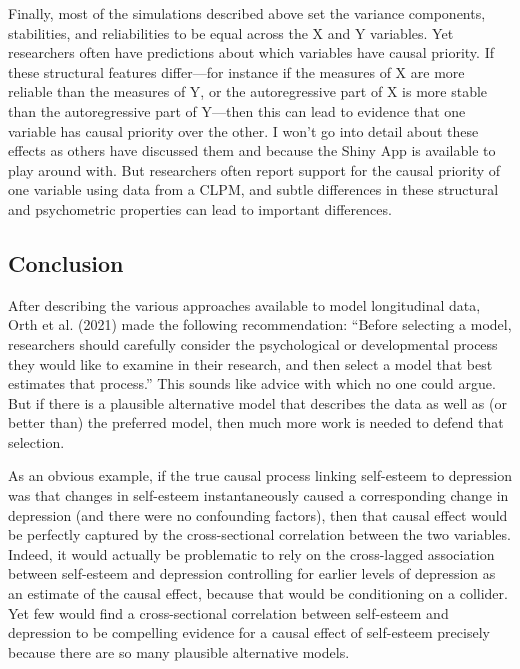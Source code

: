 \documentclass[
  english,
  man,floatsintext]{apa6}
\begin{document}
Finally, most of the simulations described above set the variance components, stabilities, and reliabilities to be equal across the X and Y variables. Yet researchers often have predictions about which variables have causal priority. If these structural features differ---for instance if the measures of X are more reliable than the measures of Y, or the autoregressive part of X is more stable than the autoregressive part of Y---then this can lead to evidence that one variable has causal priority over the other. I won't go into detail about these effects as others have discussed them and because the Shiny App is available to play around with. But researchers often report support for the causal priority of one variable using data from a CLPM, and subtle differences in these structural and psychometric properties can lead to important differences.

\hypertarget{conclusion}{%
\subsection{Conclusion}\label{conclusion}}

After describing the various approaches available to model longitudinal data, Orth et al. (2021) made the following recommendation: ``Before selecting a model, researchers should carefully consider the psychological or developmental process they would like to examine in their research, and then select a model that best estimates that process.'' This sounds like advice with which no one could argue. But if there is a plausible alternative model that describes the data as well as (or better than) the preferred model, then much more work is needed to defend that selection.

As an obvious example, if the true causal process linking self-esteem to depression was that changes in self-esteem instantaneously caused a corresponding change in depression (and there were no confounding factors), then that causal effect would be perfectly captured by the cross-sectional correlation between the two variables. Indeed, it would actually be problematic to rely on the cross-lagged association between self-esteem and depression controlling for earlier levels of depression as an estimate of the causal effect, because that would be conditioning on a collider. Yet few would find a cross-sectional correlation between self-esteem and depression to be compelling evidence for a causal effect of self-esteem precisely because there are so many plausible alternative models.
\end{document}
